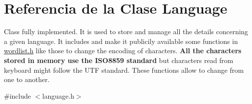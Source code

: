 \hypertarget{classLanguage}{}\section{Referencia de la Clase Language}
\label{classLanguage}


Class fully implemented. It is used to store and manage all the details concerning a given language. It includes and make it publicily available some functions in \hyperlink{wordlist_8h_source}{wordlist.\+h} like those to change the encoding of characters. {\bfseries All the characters stored in memory use the I\+S\+O8859 standard} but characters read from keyboard might follow the U\+TF standard. These functions allow to change from one to another.  




{\ttfamily \#include $<$language.\+h$>$}

